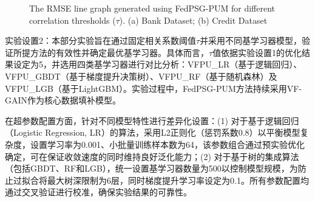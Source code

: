 \begin{figure}[!h]
	\centering
	\hspace{0.01\textwidth}  %
	
	{\centering \wuhao The RMSE line graph generated using FedPSG-PUM for different correlation thresholds ($\tau$). (a) Bank Dataset; (b) Credit Dataset}    
	\label{Chapter4Exp1Setting1}
\end{figure}

实验设置2：本部分实验旨在通过固定相关系数阈值$\tau$并采用不同基学习器模型，验证所提方法的有效性并确定最优基学习器。具体而言，$\tau$值依据实验设置1的优化结果设定为5，并选用四类基学习器进行对比分析：VFPU\_LR（基于逻辑回归）、VFPU\_GBDT（基于梯度提升决策树）、VFPU\_RF（基于随机森林）及VFPU\_LGB（基于LightGBM）。实验过程中，FedPSG-PUM方法持续采用VF-GAIN作为核心数据填补模型。

在超参数配置方面，针对不同模型特性进行差异化设置：(1) 对于基于逻辑回归（Logistic Regression, LR）的算法，采用L2正则化（惩罚系数0.8）以平衡模型复杂度，设置学习率为0.001、小批量训练样本数为64，该参数组合通过预实验优化确定，可在保证收敛速度的同时维持良好泛化能力；(2) 对于基于树的集成算法（包括GBDT、RF和LGB），统一设置基学习器数量为500以控制模型规模，为防止过拟合将最大树深限制为6层，同时梯度提升学习率设定为0.1。所有参数配置均通过交叉验证进行校准，确保实验结果的可靠性。

